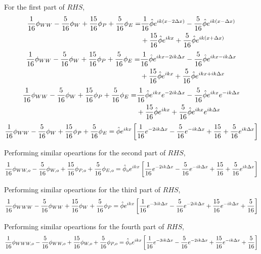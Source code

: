 \documentclass[class=report, 12pt, crop=false]{standalone}
\begin{document}
\begin{center}
For the first part of $RHS$,
\begin{equation*}
\begin{split}
\frac{1}{16}\phi_{WW} - \frac{5}{16}\phi_{W} + \frac{15}{16}\phi_{P} + \frac{5}{16}\phi_{E} = & \frac{1}{16}\hat{\phi}e^{ik(x - 2\Delta x)} - \frac{5}{16}\hat{\phi}e^{ik(x - \Delta x)}       
\\ &+ \frac{15}{16}\hat{\phi}e^{ikx} + \frac{5}{16}\hat{\phi}e^{ik(x + \Delta x)}
\end{split}
\end{equation*}
\begin{equation*}
\begin{split}
\frac{1}{16}\phi_{WW} - \frac{5}{16}\phi_{W} + \frac{15}{16}\phi_{P} + \frac{5}{16}\phi_{E} = & \frac{1}{16}\hat{\phi}e^{ikx - 2ik\Delta x} - \frac{5}{16}\hat{\phi}e^{ikx - ik\Delta x}       
\\ &+ \frac{15}{16}\hat{\phi}e^{ikx} + \frac{5}{16}\hat{\phi}e^{ikx + ik\Delta x}
\end{split}
\end{equation*}
\begin{equation*}
\begin{split}
\frac{1}{16}\phi_{WW} - \frac{5}{16}\phi_{W} + \frac{15}{16}\phi_{P} + \frac{5}{16}\phi_{E} = & \frac{1}{16}\hat{\phi}e^{ikx}e^{-2ik\Delta x} - \frac{5}{16}\hat{\phi}e^{ikx}e^{-ik\Delta x}       
\\ &+ \frac{15}{16}\hat{\phi}e^{ikx} + \frac{5}{16}\hat{\phi}e^{ikx}e^{ik\Delta x}         
\end{split}
\end{equation*}
$$\frac{1}{16}\phi_{WW} - \frac{5}{16}\phi_{W} + \frac{15}{16}\phi_{P} + \frac{5}{16}\phi_{E} = \hat{\phi}e^{ikx}\left[\frac{1}{16}e^{-2ik\Delta x} - \frac{5}{16}e^{-ik\Delta x} + \frac{15}{16} + \frac{5}{16}e^{ik\Delta x}\right]$$ 

Performing similar opeartions for the second part of $RHS$,
$$\frac{1}{16}\phi_{WW,o} - \frac{5}{16}\phi_{W,o} + \frac{15}{16}\phi_{P,o} + \frac{5}{16}\phi_{E,o} = \hat{\phi}_oe^{ikx}\left[\frac{1}{16}e^{-2ik\Delta x} - \frac{5}{16}e^{-ik\Delta x} + \frac{15}{16} + \frac{5}{16}e^{ik\Delta x}\right]$$

Performing similar opeartions for the third part of $RHS$,
$$\frac{1}{16}\phi_{WWW} - \frac{5}{16}\phi_{WW} + \frac{15}{16}\phi_{W} + \frac{5}{16}\phi_{P} = \hat{\phi}e^{ikx}\left[\frac{1}{16}e^{-3ik\Delta x} - \frac{5}{16}e^{-2ik\Delta x} + \frac{15}{16}e^{-ik\Delta x} + \frac{5}{16}\right]$$

Performing similar opeartions for the fourth part of $RHS$,$$\frac{1}{16}\phi_{WWW,o} - \frac{5}{16}\phi_{WW,o} + \frac{15}{16}\phi_{W,o} + \frac{5}{16}\phi_{P,o} = \hat{\phi}_oe^{ikx}\left[\frac{1}{16}e^{-3ik\Delta x} - \frac{5}{16}e^{-2ik\Delta x} + \frac{15}{16}e^{-ik\Delta x} + \frac{5}{16}\right]$$
   

\end{center}
\end{document}
